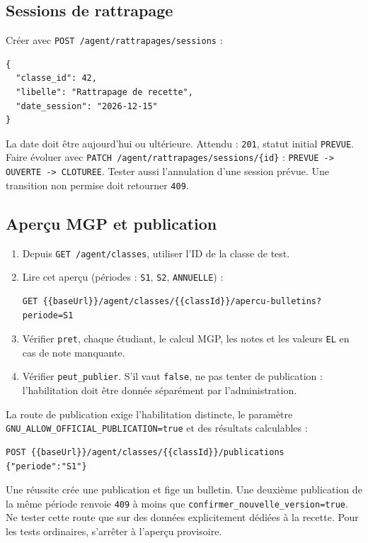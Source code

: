 \documentclass[10pt,a4paper]{article}
\newcommand{\method}[1]{\texttt{\small #1}}
\begin{document}
\subsection{Sessions de rattrapage}

Créer avec \method{POST /agent/rattrapages/sessions} :
\begin{lstlisting}
{
  "classe_id": 42,
  "libelle": "Rattrapage de recette",
  "date_session": "2026-12-15"
}
\end{lstlisting}

La date doit être aujourd’hui ou ultérieure. Attendu : \texttt{201}, statut initial \texttt{PREVUE}. Faire évoluer avec \method{PATCH /agent/rattrapages/sessions/\{id\}} : \texttt{PREVUE -> OUVERTE -> CLOTUREE}. Tester aussi l’annulation d’une session prévue. Une transition non permise doit retourner \texttt{409}.

\subsection{Aperçu MGP et publication}

\begin{enumerate}
\item Depuis \method{GET /agent/classes}, utiliser l’ID de la classe de test.
\item Lire cet aperçu (périodes : \texttt{S1}, \texttt{S2}, \texttt{ANNUELLE}) :
\begin{lstlisting}
GET {{baseUrl}}/agent/classes/{{classId}}/apercu-bulletins?periode=S1
\end{lstlisting}
\item Vérifier \texttt{pret}, chaque étudiant, le calcul MGP, les notes et les valeurs \texttt{EL} en cas de note manquante.
\item Vérifier \texttt{peut\_publier}. S’il vaut \texttt{false}, ne pas tenter de publication : l’habilitation doit être donnée séparément par l’administration.
\end{enumerate}

La route de publication exige l’habilitation distincte, le paramètre \texttt{GNU\_ALLOW\_OFFICIAL\_PUBLICATION=true} et des résultats calculables :
\begin{lstlisting}
POST {{baseUrl}}/agent/classes/{{classId}}/publications
{"periode":"S1"}
\end{lstlisting}
Une réussite crée une publication et fige un bulletin. Une deuxième publication de la même période renvoie \texttt{409} à moins que \texttt{confirmer\_nouvelle\_version=true}. Ne tester cette route que sur des données explicitement dédiées à la recette. Pour les tests ordinaires, s’arrêter à l’aperçu provisoire.
\end{document}
